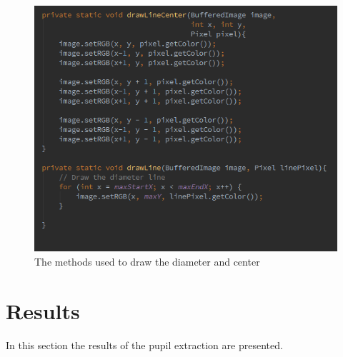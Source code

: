 \documentclass{article}
\begin{document}
%
%
\begin{figure}[H]
\centering

  \includegraphics[width=0.9\linewidth]{res/pupil/alg/draw.png}

\caption{The methods used to draw the diameter and center}
\label{fig:pup_alg_draw}
\end{figure}


\section{Results}
\label{sec:results}

In this section the results of the pupil extraction are presented.
\end{document}

